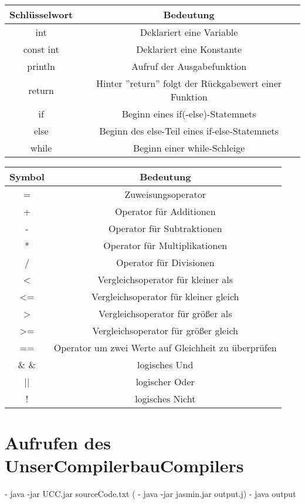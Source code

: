 \begin{center}
  \begin{tabular}{ | c | c | }
    \hline
    Schlüsselwort & Bedeutung\\ \hline \hline
    int & Deklariert eine Variable\\ \hline
    const int & Deklariert eine Konstante\\ \hline
    println & Aufruf der Ausgabefunktion\\ \hline
    return & Hinter ''return'' folgt der Rückgabewert einer Funktion\\ \hline
    if & Beginn eines if(-else)-Statemnets\\ \hline
    else & Beginn des else-Teil eines if-else-Statemnets\\ \hline
    while & Beginn einer while-Schleige\\ \hline
    
  \end{tabular}
\end{center}


\begin{center}
  \begin{tabular}{ | c | c | }
    \hline
    Symbol & Bedeutung\\ \hline \hline
    = & Zuweisungsoperator\\ \hline
    + & Operator für Additionen\\ \hline
    - & Operator für Subtraktionen\\ \hline
    * & Operator für Multiplikationen\\ \hline
    / & Operator für Divisionen\\ \hline
    
    < & Vergleichsoperator für kleiner als\\ \hline
    <= & Vergleichsoperator für kleiner gleich\\ \hline
    > & Vergleichsoperator für größer als\\ \hline
    >= & Vergleichsoperator für größer gleich\\ \hline    
    == & Operator um zwei Werte auf Gleichheit zu überprüfen\\ \hline    
    
    \& \&  & logisches Und \\ \hline    
    || & logischer Oder \\ \hline    
    ! & logisches Nicht \\ \hline    
    
  \end{tabular}
\end{center}
	
\section{Aufrufen des UnserCompilerbauCompilers}
	- java -jar UCC.jar sourceCode.txt
  (	- java -jar jasmin.jar output.j)
  	- java output
